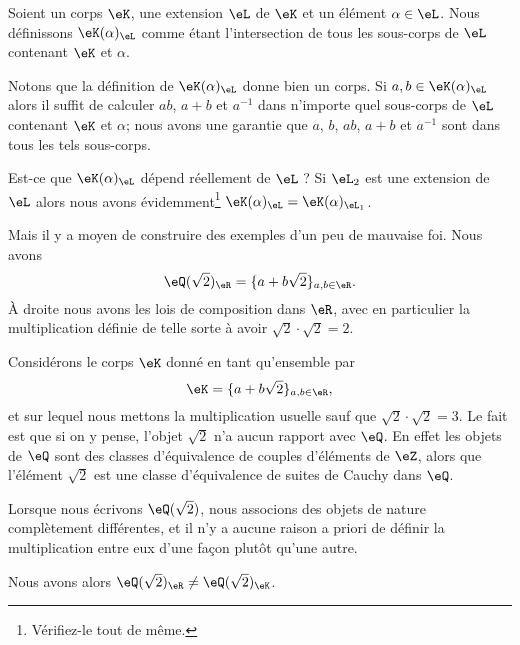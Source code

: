 \begin{definition}  \label{DEFooVSKGooMyeGel}
    Soient un corps \( \eK\), une extension \( \eL\) de \( \eK\) et un élément \( \alpha\in\eL\). Nous définissons \( \eK(\alpha)_{\eL} \) comme étant l'intersection de tous les sous-corps de \( \eL\) contenant \( \eK\) et \( \alpha\).
\end{definition}

Notons que la définition de \( \eK(\alpha)_{\eL}\) donne bien un corps. Si \( a,b\in \eK(\alpha)_{\eL}\) alors il suffit de calculer \( ab\), \( a+b\) et \( a^{-1}\) dans n'importe quel sous-corps de \( \eL\) contenant \( \eK\) et \( \alpha\); nous avons une garantie que \( a\), \( b\), \( ab  \), \( a+b\) et \( a^{-1}\) sont dans tous les tels sous-corps.

\begin{example}      \label{EXooJRSUooYhAZkR}
    Est-ce que \( \eK(\alpha)_{\eL}\) dépend réellement de \( \eL\) ? Si \( \eL_2\) est une extension de \( \eL\) alors nous avons évidemment\footnote{Vérifiez-le tout de même.} \( \eK(\alpha)_{\eL}=\eK(\alpha)_{\eL_1}\).

    Mais il y a moyen de construire des exemples d'un peu de mauvaise foi. Nous avons 
    \begin{equation}
        \eQ(\sqrt{ 2 })_{\eR}=\{ a+b\sqrt{ 2 } \}_{a,b\in \eR}.
    \end{equation}
    À droite nous avons les lois de composition dans \( \eR\), avec en particulier la multiplication définie de telle sorte à avoir \( \sqrt{ 2 }\cdot\sqrt{ 2 }=2 \).

    Considérons le corps \( \eK\) donné en tant qu'ensemble par
    \begin{equation}
        \eK=\{ a+b\sqrt{ 2 } \}_{a,b\in \eR},
    \end{equation}
    et sur lequel nous mettons la multiplication usuelle sauf que \( \sqrt{ 2 }\cdot \sqrt{ 2 }=3\). Le fait est que si on y pense, l'objet \( \sqrt{ 2 }\) n'a aucun rapport avec \( \eQ\). En effet les objets de \( \eQ\) sont des classes d'équivalence de couples d'éléments de \( \eZ\), alors que l'élément \( \sqrt{ 2 }\) est une classe d'équivalence de suites de Cauchy dans \( \eQ\).

    Lorsque nous écrivons \( \eQ(\sqrt{ 2 })\), nous associons des objets de nature complètement différentes, et il n'y a aucune raison a priori de définir la multiplication entre eux d'une façon plutôt qu'une autre.

    Nous avons alors \( \eQ(\sqrt{ 2 })_{\eR}\neq \eQ(\sqrt{ 2 })_{\eK}\).
\end{example}

